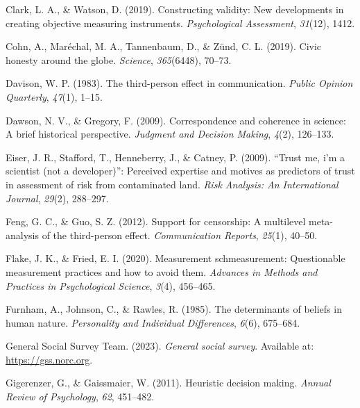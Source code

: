 \documentclass[
  ,jou,floatsintext]{apa6}
\newlength{\cslhangindent}
\newlength{\cslentryspacingunit} %
\newenvironment{CSLReferences}[2] %
 {%
  \setlength{\parindent}{0pt}
  \ifodd #1
  \let\oldpar\par
  \def\par{\hangindent=\cslhangindent\oldpar}
  \fi
  \setlength{\parskip}{#2\cslentryspacingunit}
 }%
 {}
\begin{document}
\begin{CSLReferences}{1}{0}
\leavevmode{}%
Clark, L. A., \& Watson, D. (2019). Constructing validity: New developments in creating objective measuring instruments. \emph{Psychological Assessment}, \emph{31}(12), 1412.

\leavevmode{}%
Cohn, A., Maréchal, M. A., Tannenbaum, D., \& Zünd, C. L. (2019). Civic honesty around the globe. \emph{Science}, \emph{365}(6448), 70--73.

\leavevmode{}%
Davison, W. P. (1983). The third-person effect in communication. \emph{Public Opinion Quarterly}, \emph{47}(1), 1--15.

\leavevmode{}%
Dawson, N. V., \& Gregory, F. (2009). Correspondence and coherence in science: A brief historical perspective. \emph{Judgment and Decision Making}, \emph{4}(2), 126--133.

\leavevmode{}%
Eiser, J. R., Stafford, T., Henneberry, J., \& Catney, P. (2009). {``Trust me, i'm a scientist (not a developer)''}: Perceived expertise and motives as predictors of trust in assessment of risk from contaminated land. \emph{Risk Analysis: An International Journal}, \emph{29}(2), 288--297.

\leavevmode{}%
Feng, G. C., \& Guo, S. Z. (2012). Support for censorship: A multilevel meta-analysis of the third-person effect. \emph{Communication Reports}, \emph{25}(1), 40--50.

\leavevmode{}%
Flake, J. K., \& Fried, E. I. (2020). Measurement schmeasurement: Questionable measurement practices and how to avoid them. \emph{Advances in Methods and Practices in Psychological Science}, \emph{3}(4), 456--465.

\leavevmode{}%
Furnham, A., Johnson, C., \& Rawles, R. (1985). The determinants of beliefs in human nature. \emph{Personality and Individual Differences}, \emph{6}(6), 675--684.

\leavevmode{}%
General Social Survey Team. (2023). \emph{General social survey}. Available at: \url{https://gss.norc.org}.

\leavevmode{}%
Gigerenzer, G., \& Gaissmaier, W. (2011). Heuristic decision making. \emph{Annual Review of Psychology}, \emph{62}, 451--482.


\end{CSLReferences}
\end{document}
